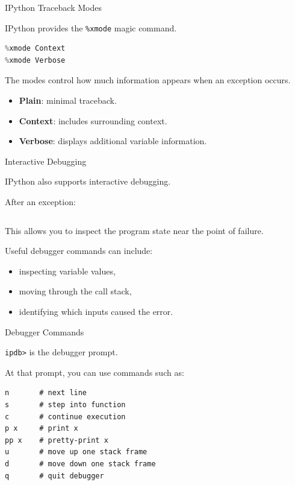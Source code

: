 \documentclass[aspectratio=43,10pt]{beamer}
\begin{document}
\begin{frame}[fragile]{IPython Traceback Modes}

IPython provides the \texttt{\%xmode} magic command.

\begin{lstlisting}[language=Python]
%xmode Plain
%xmode Context
%xmode Verbose
\end{lstlisting}

The modes control how much information appears when an exception occurs.

\begin{itemize}
  \item \textbf{Plain}: minimal traceback.
  \item \textbf{Context}: includes surrounding context.
  \item \textbf{Verbose}: displays additional variable information.
\end{itemize}

\end{frame}

\begin{frame}[fragile]{Interactive Debugging}

IPython also supports interactive debugging.

After an exception:

\begin{lstlisting}[language=Python]
%debug
\end{lstlisting}

This allows you to inspect the program state near the point of failure.

Useful debugger commands can include:

\begin{itemize}
  \item inspecting variable values,
  \item moving through the call stack,
  \item identifying which inputs caused the error.
\end{itemize}

\end{frame}

\begin{frame}[fragile]{Debugger Commands}

\texttt{ipdb>} is the debugger prompt.

At that prompt, you can use commands such as:

\begin{lstlisting}
n       # next line
s       # step into function
c       # continue execution
p x     # print x
pp x    # pretty-print x
u       # move up one stack frame
d       # move down one stack frame
q       # quit debugger
\end{lstlisting}

\end{frame}
\end{document}

